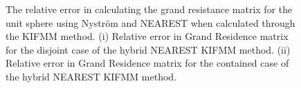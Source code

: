 \begin{figure}[ht!]
 \centering
 \caption[The relative error in calculating the grand resistance matrix for the unit sphere using Nyström and NEAREST when calculated through the KIFMM method.]{The relative error in calculating the grand resistance matrix for the unit sphere using Nyström and NEAREST when calculated through the KIFMM method. (i) Relative error in Grand Residence matrix for the disjoint case of the hybrid NEAREST KIFMM method. (ii) Relative error in Grand Residence matrix for the contained case of the hybrid NEAREST KIFMM method.}
 \label{fig:NEARESTCOMPFMM}
\end{figure}